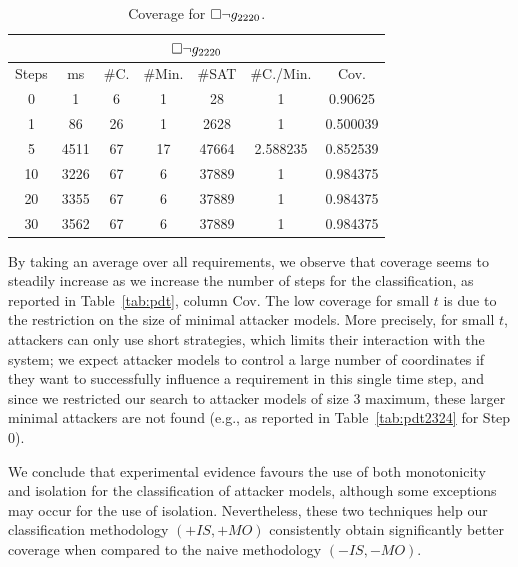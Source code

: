 {%
\begin{table}[!t]
	\centering
\caption{Coverage for ${{\square}} \lnot g_{2220}$.}
{
\begin{tabular}{|c|c|c|c|c|c|c|}
\hline
\multicolumn{7}{|c|}{${{\square}} \lnot g_{2220}$} \\
\hline
Steps & ms &  \#C. & \#Min. & \#SAT & \#C./Min. & Cov.\\
\hline
0 & 1 & 6 & 1 & 28 & 1 & 0.90625\\
1 & 86 & 26 & 1 & 2628 & 1 & 0.500039\\
5 & 4511 & 67 & 17 & 47664 & 2.588235 & 0.852539\\
10 & 3226 & 67 & 6 & 37889 & 1 & 0.984375\\
20 & 3355 & 67 & 6 & 37889 & 1 & 0.984375\\
30 & 3562 & 67 & 6 & 37889 & 1 & 0.984375\\
 \hline
\end{tabular}
}
\label{tab:pdt2367}
\end{table}
By taking an average over all requirements, we observe that coverage seems to steadily increase as we increase the number of steps for the classification, as reported in Table~\ref{tab:pdt}, column Cov. The low coverage for small $t$ is due to the restriction on the size of minimal attacker models. More precisely, for small $t$, attackers can only use short strategies, which limits their interaction with the system; we expect attacker models to control a large number of coordinates if they want to successfully influence a requirement in this single time step, and since we restricted our search to attacker models of size 3 maximum, these larger minimal attackers are not found (e.g., as reported in Table~\ref{tab:pdt2324} for Step 0).

We conclude that experimental evidence favours the use of both monotonicity and isolation for the classification of attacker models, although  some exceptions may occur for the use of isolation. Nevertheless, these two techniques help our classification methodology $(+IS,+MO)$ consistently obtain significantly better coverage when compared to the naive methodology $(-IS,-MO)$.

}
